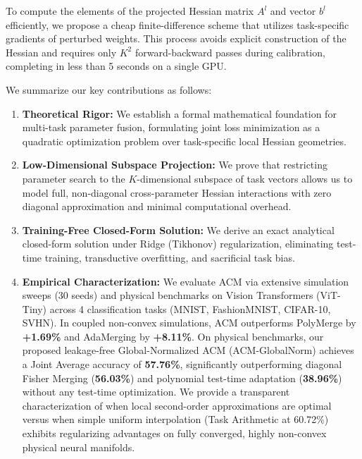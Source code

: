 To compute the elements of the projected Hessian matrix $A^l$ and vector $b^l$ efficiently, we propose a cheap finite-difference scheme that utilizes task-specific gradients of perturbed weights. This process avoids explicit construction of the Hessian and requires only $K^2$ forward-backward passes during calibration, completing in less than 5 seconds on a single GPU.

We summarize our key contributions as follows:
\begin{enumerate}
    \item \textbf{Theoretical Rigor:} We establish a formal mathematical foundation for multi-task parameter fusion, formulating joint loss minimization as a quadratic optimization problem over task-specific local Hessian geometries.
    \item \textbf{Low-Dimensional Subspace Projection:} We prove that restricting parameter search to the $K$-dimensional subspace of task vectors allows us to model full, non-diagonal cross-parameter Hessian interactions with zero diagonal approximation and minimal computational overhead.
    \item \textbf{Training-Free Closed-Form Solution:} We derive an exact analytical closed-form solution under Ridge (Tikhonov) regularization, eliminating test-time training, transductive overfitting, and sacrificial task bias.
    \item \textbf{Empirical Characterization:} We evaluate ACM via extensive simulation sweeps (30 seeds) and physical benchmarks on Vision Transformers (ViT-Tiny) across 4 classification tasks (MNIST, FashionMNIST, CIFAR-10, SVHN). In coupled non-convex simulations, ACM outperforms PolyMerge by \textbf{+1.69\%} and AdaMerging by \textbf{+8.11\%}. On physical benchmarks, our proposed leakage-free Global-Normalized ACM (ACM-GlobalNorm) achieves a Joint Average accuracy of \textbf{57.76\%}, significantly outperforming diagonal Fisher Merging (\textbf{56.03\%}) and polynomial test-time adaptation (\textbf{38.96\%}) without any test-time optimization. We provide a transparent characterization of when local second-order approximations are optimal versus when simple uniform interpolation (Task Arithmetic at 60.72\%) exhibits regularizing advantages on fully converged, highly non-convex physical neural manifolds.
\end{enumerate}
